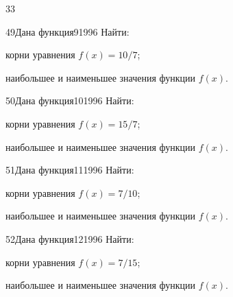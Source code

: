 \begin{TrigSourcePage}{33}
\begin{TrigExercise}{49}{Дана функция}{9}{1996}
Найти:
\begin{TrigParts}
\item корни уравнения $f(x)=10/7$;
\item наибольшее и наименьшее значения функции $f(x)$.

\end{TrigParts}
\end{TrigExercise}
\begin{TrigExercise}{50}{Дана функция}{10}{1996}
Найти:
\begin{TrigParts}
\item корни уравнения $f(x)=15/7$;
\item наибольшее и наименьшее значения функции $f(x)$.

\end{TrigParts}
\end{TrigExercise}
\begin{TrigExercise}{51}{Дана функция}{11}{1996}
Найти:
\begin{TrigParts}
\item корни уравнения $f(x)=7/10$;
\item наибольшее и наименьшее значения функции $f(x)$.

\end{TrigParts}
\end{TrigExercise}
\begin{TrigExercise}{52}{Дана функция}{12}{1996}
Найти:
\begin{TrigParts}
\item корни уравнения $f(x)=7/15$;
\item наибольшее и наименьшее значения функции $f(x)$.


\end{TrigParts}
\end{TrigExercise}
\end{TrigSourcePage}
